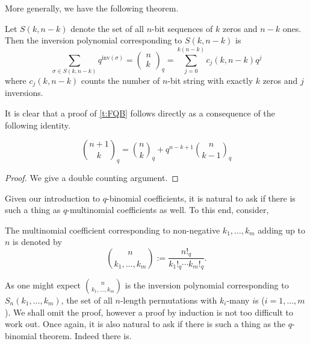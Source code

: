 More generally, we have the following theorem.
\begin{theorem}
Let $S(k,n-k)$ denote the set of all $n$-bit sequences of $k$ zeros and $n-k$ ones. Then the inversion polynomial corresponding to $S(k,n-k)$ is \[\sum_{\sigma\in S(k,n-k)} q^{\text{inv}(\sigma)}=\left(\begin{array}{c}n \\ k \end{array}\right)_q = \sum_{j=0}^{k(n-k)}c_j(k,n-k)q^j\] where $c_j(k,n-k)$ counts the number of $n$-bit string with exactly $k$ zeros and $j$ inversions.
\label{t:FQB}
\end{theorem}
It is clear that a proof of \cref{t:FQB} follows directly as a consequence of the following identity.
\begin{claim}
\[
    \binom{n+1}{k}_q = \binom{n}{k}_q + q^{n-k+1}\binom{n}{k-1}_q
\]
\label{c:q_Pascal}
\end{claim}
\begin{proof}
We give a double counting argument. 
\end{proof}
Given our introduction to $q$-binomial coefficients, it is natural to ask if there is such a thing as $q$-multinomial coefficients as well. To this end, consider,
\begin{definition}
The multinomial coefficient corresponding to non-negative $k_1,\ldots,k_m$ adding up to $n$ is denoted by
\[
\binom{n}{k_1,\ldots,k_m} := \dfrac{n!_q}{k_1!_q\cdots k_m!_q}.
\]
\end{definition}
As one might expect $\binom{n}{k_1,\ldots,k_m}$ is the inversion polynomial corresponding to $S_n(k_1,\ldots,k_m)$, the set of all $n$-length permutations with $k_i$-many $i$s ($i=1,\ldots,m$). We shall omit the proof, however a proof by induction is not too difficult to work out. Once again, it is also natural to ask if there is such a thing as the $q$-binomial theorem. Indeed there is.
\begin{theorem}
\end{theorem}
